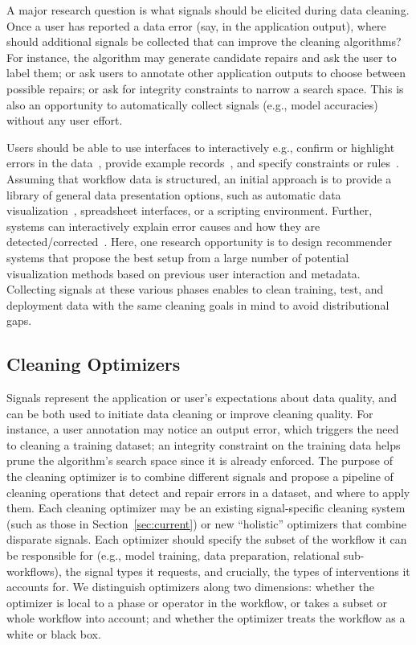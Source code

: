 \documentclass[11pt,dvipsnames]{article}
\begin{document}
A major research question is what signals should be elicited during data cleaning.  Once a user has reported a data error (say, in the application output), where should additional signals be collected that can improve the cleaning algorithms?  For instance, the algorithm may generate candidate repairs and ask the user to label them; or ask users to annotate other application outputs to choose between possible repairs; or ask for integrity constraints to narrow a search space.    This is also an opportunity to automatically collect signals (e.g., model accuracies) without any user effort. 


\newpage
{} 
Users should be able to use interfaces to interactively e.g., confirm or highlight errors in the data~\cite{ED2, Raha, Baran}, provide example records~\cite{Baran,DataXFormer}, and specify constraints or rules~\cite{NADEEF}.    Assuming that workflow data is structured, an initial approach is to provide a library of general data presentation options, such as automatic data visualization~\cite{apt,ShowMe}, spreadsheet interfaces, or a scripting environment.  
Further, systems can interactively explain error causes and how they are detected/corrected~\cite{DataXRay, Scorpion, CAPE_OutlierExplanation, BugDoc, Vizier, ReverseDataManagement}.
Here, one research opportunity is to design recommender systems that propose the best setup from a large number of potential visualization methods based on previous user interaction and metadata. Collecting signals at these various phases enables to clean training, test, and deployment data with the same cleaning goals in mind to avoid distributional gaps.

\subsection{Cleaning Optimizers}

Signals represent the application or user's expectations about data quality, and can be both used to initiate data cleaning or improve cleaning quality.  For instance, a user annotation may notice an output error, which triggers the need to cleaning a training dataset; an integrity constraint on the training data helps prune the algorithm's search space since it is already enforced.     
%
The purpose of the cleaning optimizer is to combine different signals and propose a pipeline of cleaning operations that detect and repair errors in a dataset, and where to apply them. 
Each cleaning optimizer may be an existing signal-specific cleaning system (such as those in Section~\ref{sec:current}) or new ``holistic'' optimizers that combine disparate signals.  Each optimizer should specify the subset of the workflow it can be responsible for (e.g., model training, data preparation, relational sub-workflows), the signal types it requests, and crucially, the types of interventions it accounts for.   
%
We distinguish optimizers along two dimensions: whether the optimizer is local to a phase or operator in the workflow, or takes a subset or whole workflow into account; and whether the optimizer treats the workflow as a white or black box.  
\end{document}
